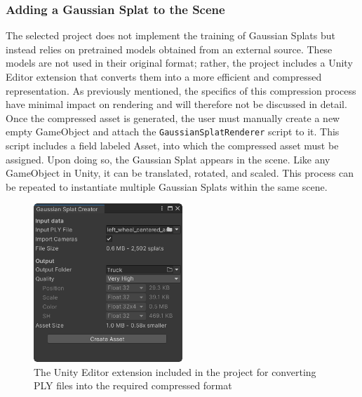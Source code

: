 \documentclass[12pt]{article}
\begin{document}
\subsubsection{Adding a Gaussian Splat to the Scene}
The selected project does not implement the training of Gaussian Splats but instead relies on pretrained models obtained from an external source. These models are not used in their original format; rather, the project includes a Unity Editor extension that converts them into a more efficient and compressed representation. As previously mentioned, the specifics of this compression process have minimal impact on rendering and will therefore not be discussed in detail. Once the compressed asset is generated, the user must manually create a new empty GameObject and attach the \texttt{GaussianSplatRenderer} script to it. This script includes a field labeled Asset, into which the compressed asset must be assigned. Upon doing so, the Gaussian Splat appears in the scene. Like any GameObject in Unity, it can be translated, rotated, and scaled. This process can be repeated to instantiate multiple Gaussian Splats within the same scene.
\begin{figure}[h!]
	\centering
	\includegraphics[width=0.5\textwidth]{Images/SplatCreator.png}
	\caption{The Unity Editor extension included in the project for converting PLY files into the required compressed format}
	\label{fig:creator}
\end{figure}
\end{document}

